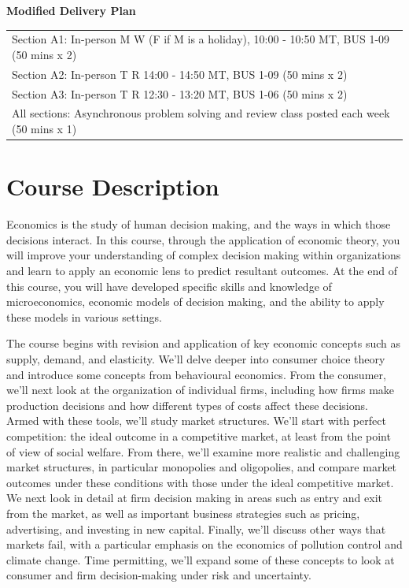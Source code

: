 \documentclass[11pt,]{article}
\begin{document}
\begin{center}
\textbf{Modified Delivery Plan}\medskip\\
\begin{tabular}{l}
Section A1: In-person M W (F if M is a holiday), 10:00 - 10:50 MT, BUS 1-09 (50 mins x 2)\\
Section A2: In-person T R 14:00 - 14:50 MT, BUS 1-09 (50 mins x 2)\\
Section A3: In-person T R 12:30 - 13:20 MT, BUS 1-06 (50 mins x 2)\\
All sections: Asynchronous problem solving and review class posted each week (50 mins x 1) \\%
    \hline
    \end{tabular}
\end{center}

\hypertarget{course-description}{%
\section{Course Description}\label{course-description}}

Economics is the study of human decision making, and the ways in which
those decisions interact. In this course, through the application of
economic theory, you will improve your understanding of complex decision
making within organizations and learn to apply an economic lens to
predict resultant outcomes. At the end of this course, you will have
developed specific skills and knowledge of microeconomics, economic
models of decision making, and the ability to apply these models in
various settings.

The course begins with revision and application of key economic concepts
such as supply, demand, and elasticity. We'll delve deeper into consumer
choice theory and introduce some concepts from behavioural economics.
From the consumer, we'll next look at the organization of individual
firms, including how firms make production decisions and how different
types of costs affect these decisions. Armed with these tools, we'll
study market structures. We'll start with perfect competition: the ideal
outcome in a competitive market, at least from the point of view of
social welfare. From there, we'll examine more realistic and challenging
market structures, in particular monopolies and oligopolies, and compare
market outcomes under these conditions with those under the ideal
competitive market. We next look in detail at firm decision making in
areas such as entry and exit from the market, as well as important
business strategies such as pricing, advertising, and investing in new
capital. Finally, we'll discuss other ways that markets fail, with a
particular emphasis on the economics of pollution control and climate
change. Time permitting, we'll expand some of these concepts to look at
consumer and firm decision-making under risk and uncertainty.
\end{document}
